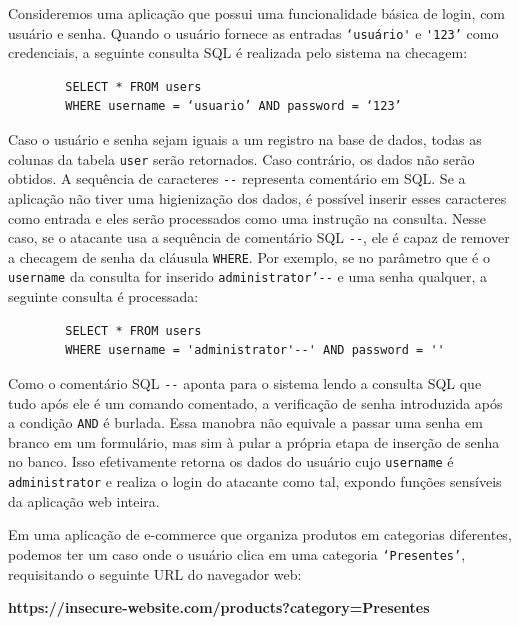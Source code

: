 \begin{alineas}
    \item 
    Consideremos uma aplicação que possui uma funcionalidade básica de login, com usuário e senha. Quando o usuário fornece as entradas \verb+‘usuário'+ e \verb+'123’+ como credenciais, a seguinte consulta SQL é realizada pelo sistema na checagem:
    
    \begin{verbatim}
        SELECT * FROM users 
        WHERE username = ‘usuario’ AND password = ‘123’
    \end{verbatim}
    
    Caso o usuário e senha sejam iguais a um registro na base de dados, todas as colunas da tabela \verb+user+ serão retornados. Caso contrário, os dados não serão obtidos.
    A sequência de caracteres \verb+--+ representa comentário em SQL. Se a aplicação não tiver uma higienização dos dados, é possível inserir esses caracteres como entrada e eles serão processados como uma instrução na consulta. Nesse caso, se o atacante usa a sequência de comentário SQL \verb+--+, ele é capaz de remover a checagem de senha da cláusula \verb+WHERE+. Por exemplo, se no parâmetro que é o \verb+username+ da consulta for inserido \verb+administrator’--+ e uma senha qualquer, a seguinte consulta é processada:
    
    \begin{verbatim}
        SELECT * FROM users 
        WHERE username = 'administrator'--' AND password = '' 
    \end{verbatim}
    
    Como o comentário SQL \verb+--+ aponta para o sistema lendo a consulta SQL que tudo após ele é um comando comentado, a verificação de senha introduzida após a condição \verb+AND+ é burlada. Essa manobra não equivale a passar uma senha em branco em um formulário, mas sim à pular a própria etapa de inserção de senha no banco. Isso efetivamente retorna os dados do usuário cujo \verb+username+ é \verb+administrator+ e realiza o login do atacante como tal, expondo funções sensíveis da aplicação web inteira.

    \item
    Em uma aplicação de e-commerce que organiza produtos em categorias diferentes, podemos ter um caso onde o usuário clica em uma categoria \verb+‘Presentes’+, requisitando o seguinte URL do navegador web:
    
    \textbf{https://insecure-website.com/products?category=Presentes}
    

\end{alineas}

